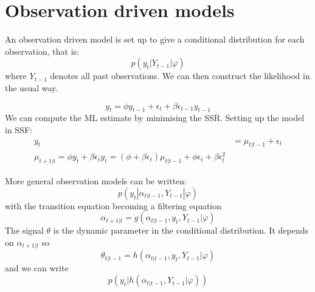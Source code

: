 \documentclass[DIV=14,titlepage=false]{scrreprt}
\begin{document}
\section{Observation driven models}
An observation driven model is set up to give a conditional distribution for each observation, that is:
\[
    p(y_t|Y_{t-1}|\varphi)
\]
where $Y_{t-1}$ denotes all past observations. We can then construct the likelihood in the usual way.
\begin{example}
    \[
        y_t = \phi y_{t-1} + \epsilon_t + \beta \epsilon_{t-1} y_{t-1}
    \]
    We can compute the ML estimate by minimising the SSR. Setting up the model in SSF:
    \begin{align*}
        y_t &= \mu_{t|t-1} + \epsilon_t\\
        \mu_{t+1|t} = \phi y_t + \beta \epsilon_t y_t = (\phi + \beta \epsilon_t)\mu_{t|t-1} + \phi \epsilon_t + \beta \epsilon_t^2
    \end{align*}
\end{example}
More general observation models can be written:
\[
    p(y_t | \alpha_{t|t-1}, Y_{t-1}|\varphi)
\]
with the transition equation becoming a filtering equation\[
    \alpha_{t+1|t} = g(\alpha_{t|t-1}, y_t, Y_{t-1}|\varphi)
\]
The signal $\theta$ is the dynamic parameter in the conditional distribution. It depends on $\alpha_{t+1|t}$ so \[
    \theta_{t|t-1} = h(\alpha_{t|t-1}, y_t, Y_{t-1}|\varphi)
    \]
    and we can write
    \[
        p(y_t|h(\alpha_{t|t-1}, Y_{t-1}|\varphi))   
    \]
\end{document}
